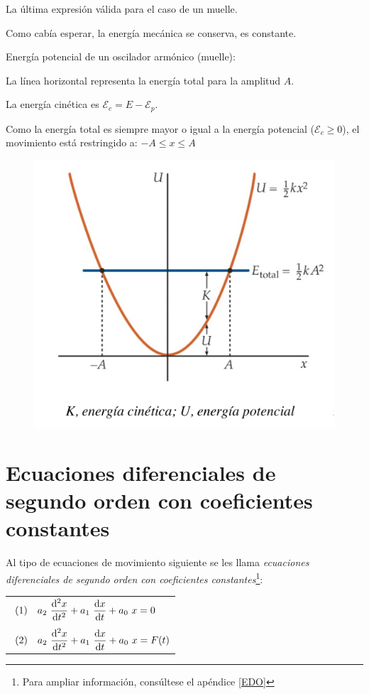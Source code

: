 \small{La última expresión válida para el caso de un muelle\normalsize{.}

Como cabía esperar, la energía mecánica se conserva, es constante.

\vspace{20mm} %
\begin{multicols}{2}
Energía potencial de un oscilador armónico (muelle):

La línea horizontal representa la energía total para la amplitud $A$.

La energía cinética es $\mathcal E_c=E-\mathcal E_p$.

Como la energía total es siempre mayor o igual a la energía potencial ($\mathcal E_c\geq 0$), el movimiento está restringido a: $ -A\leq x \leq A$	
\begin{figure}[H]
		\centering
		\includegraphics[width=.4\textwidth]{imagenes/imagenes19/T19IM05.png}
	\end{figure}
\end{multicols}

\section[Ecuaciones diferenciales de segundo orden con coeficientes constantes]{Ecuaciones diferenciales de segundo orden con coeficientes constantes}

Al tipo de ecuaciones de movimiento siguiente se les llama \emph{ecuaciones diferenciales de segundo orden con coeficientes constantes}\footnote{Para ampliar información, consúltese el apéndice \ref{EDO}}:

\begin{table}[H]
\centering
\begin{tabular}{l}
	$\ (1) \quad \displaystyle a_2 \ \dv[2]{x}{t}+a_1\ \dv{x}{t}+a_0\ x=0$ \\ \\
	$\ (2) \quad \displaystyle a_2 \ \dv[2]{x}{t}+a_1\ \dv{x}{t}+a_0\ x=F(t)$
\end{tabular}
\end{table}

}
